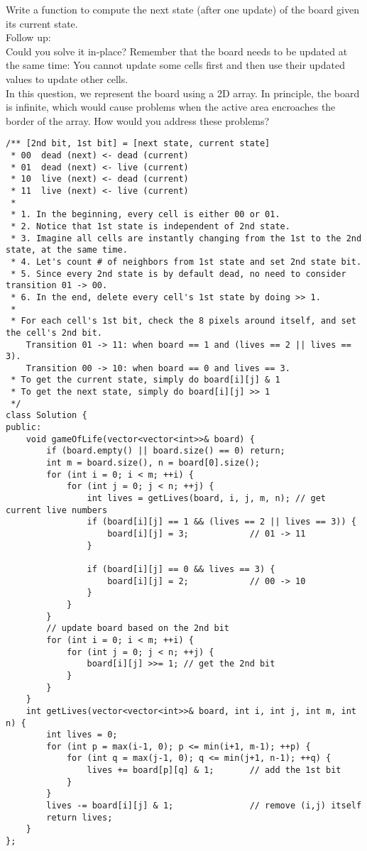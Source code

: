 Write a function to compute the next state (after one update) of the board given its current state.\\

Follow up:\\
    Could you solve it in-place? Remember that the board needs to be updated at the same time: You cannot update some cells first and then use their updated values to update other cells.\\
    In this question, we represent the board using a 2D array. In principle, the board is infinite, which would cause problems when the active area encroaches the border of the array. How would you address these problems?\\
    
\begin{lstlisting}
/** [2nd bit, 1st bit] = [next state, current state]
 * 00  dead (next) <- dead (current)
 * 01  dead (next) <- live (current)  
 * 10  live (next) <- dead (current)  
 * 11  live (next) <- live (current) 
 * 
 * 1. In the beginning, every cell is either 00 or 01.
 * 2. Notice that 1st state is independent of 2nd state.
 * 3. Imagine all cells are instantly changing from the 1st to the 2nd state, at the same time.
 * 4. Let's count # of neighbors from 1st state and set 2nd state bit.
 * 5. Since every 2nd state is by default dead, no need to consider transition 01 -> 00.
 * 6. In the end, delete every cell's 1st state by doing >> 1.
 * 
 * For each cell's 1st bit, check the 8 pixels around itself, and set the cell's 2nd bit.
    Transition 01 -> 11: when board == 1 and (lives == 2 || lives == 3).
    Transition 00 -> 10: when board == 0 and lives == 3.
 * To get the current state, simply do board[i][j] & 1
 * To get the next state, simply do board[i][j] >> 1
 */
class Solution {
public:
    void gameOfLife(vector<vector<int>>& board) {
        if (board.empty() || board.size() == 0) return;
        int m = board.size(), n = board[0].size();
        for (int i = 0; i < m; ++i) {
            for (int j = 0; j < n; ++j) {
                int lives = getLives(board, i, j, m, n); // get current live numbers
                if (board[i][j] == 1 && (lives == 2 || lives == 3)) {
                    board[i][j] = 3;            // 01 -> 11
                }
                
                if (board[i][j] == 0 && lives == 3) {
                    board[i][j] = 2;            // 00 -> 10
                }
            }
        }
        // update board based on the 2nd bit
        for (int i = 0; i < m; ++i) {
            for (int j = 0; j < n; ++j) {
                board[i][j] >>= 1; // get the 2nd bit
            }
        }
    }
    int getLives(vector<vector<int>>& board, int i, int j, int m, int n) {
        int lives = 0;
        for (int p = max(i-1, 0); p <= min(i+1, m-1); ++p) {
            for (int q = max(j-1, 0); q <= min(j+1, n-1); ++q) {
                lives += board[p][q] & 1;       // add the 1st bit
            }
        }
        lives -= board[i][j] & 1;               // remove (i,j) itself
        return lives;
    }
};    
\end{lstlisting}


